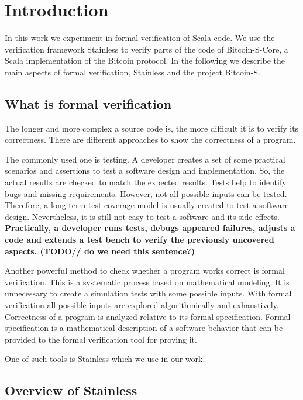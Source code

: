 \chapter{Introduction}
\label{chap:introduction}

In this work we experiment in formal verification of Scala code. 
We use the verification framework Stainless to verify parts of the code of Bitcoin-S-Core, a Scala implementation of the Bitcoin protocol.
In the following we describe the main aspects of formal verification, Stainless and the project Bitcoin-S.


\section{What is formal verification}
\label{sec:formal_verification}

The longer and more complex a source code is, the more difficult it is to verify its correctness.
There are different approaches to show the correctness of a program.

The commonly used one is testing.
A developer creates a set of some practical scenarios and assertions to test a software design and implementation. 
So, the actual results are checked to match the expected results.
Tests help to identify bugs and missing requirements.
However, not all possible inputs can be tested. 
Therefore, a long-term test coverage model is usually created to test a software design.
Nevertheless, it is still not easy to test a software and its side effects.
\textbf{Practically, a developer runs tests, debugs appeared failures, adjusts a code and extends a test bench to verify the previously uncovered aspects. (TODO// do we need this sentence?)}\cite{sanghavi:formal_verification}

Another powerful method to check whether a program works correct is formal verification.
This is a systematic process based on mathematical modeling.
It is unnecessary to create a simulation tests with some possible inputs.
With formal verification all possible inputs are explored algorithmically and exhaustively.
Correctness of a program is analyzed relative to its formal specification.
Formal specification is a mathematical description of a software behavior that can be provided to the formal verification tool for proving it.\cite{sanghavi:formal_verification}

One of such tools is Stainless which we use in our work.


\section{Overview of Stainless}
\label{sec:stainless}

